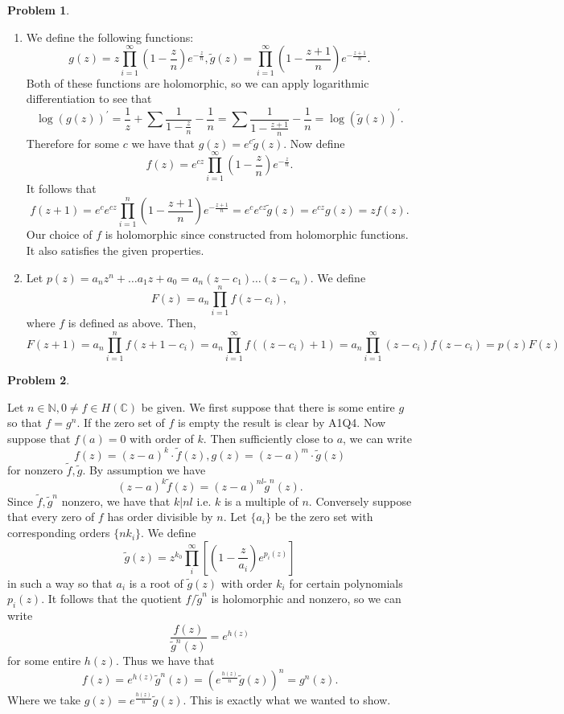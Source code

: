 \documentclass[12pt, a4paper]{article}
\newtheorem{problem}{Problem}
\theoremstyle{definition}
\newcommand{\penum}{ \begin{enumerate}[label=\bf(\alph*), leftmargin=0pt]}
\newcommand{\epenum}{ \end{enumerate} }
\newcommand{\N}{\mathbb{N}}                           %
\newcommand{\C}{\mathbb{C}}                           %
\begin{document}
\newpage
\begin{problem}
\end{problem}
\penum
\item
We define the following functions: $$g(z) = z\prod_{i=1}^\infty \left(1 - \frac{z}{n}\right)e^{-\frac{z}{n}}, \tilde{g}(z)  = \prod_{i=1}^\infty \left(1 - \frac{z+1}{n} \right)e^{-\frac{z+1}{n}}.$$ Both of these functions are holomorphic, so we can apply logarithmic differentiation to see that $$\log(g(z))^\prime = \frac{1}{z} + \sum \frac{1}{1 - \frac{z}{n}}- \frac{1}{n} = \sum \frac{1}{1 - \frac{z+1}{n}}  - \frac{1}{n} = \log(\tilde{g}(z))^\prime.$$ Therefore for some $c$ we have that $g(z) = e^c \tilde{g}(z).$ Now define $$f(z) = e^{cz} \prod_{i=1}^\infty \left( 1 - \frac{z}{n}\right) e^{-\frac{z}{n}}.$$ It follows that $$f(z+1) = e^c e^{cz} \prod_{i=1}^n \left(1- \frac{z+1}{n}	\right) e^{- \frac{z+1}{n}} = e^{c}e^{cz}\tilde{g}(z) = e^{cz}g(z) =zf(z).$$
Our choice of $f$ is holomorphic since constructed from holomorphic functions. It also satisfies the given properties. 
\item Let $p(z) = a_nz^n + \dots a_1z+a_0 = a_n(z-c_1)\dots (z-c_n).$ We define $$F(z) = a_n \prod_{i=1}^n f(z-c_i),$$ where $f$ is defined as above. Then, $$F(z+1) = a_n \prod_{i=1}^n f(z+1-c_i) = a_n \prod_{i=1}^\infty f((z-c_i) +1) =a_n \prod_{i=1}^\infty(z-c_i)f(z-c_i) = p(z)F(z)$$
\epenum
\newpage
\begin{problem}
\end{problem}
Let $n\in \N, 0\neq f\in H(\C)$ be given. We first suppose that there is some entire $g$ so that $f = g^n$. If the zero set of $f$ is empty the result is clear by A1Q4. Now suppose that $f(a)=0$ with order of $k$. Then sufficiently close to $a$, we can write $$f(z) = (z-a)^k \cdot \tilde{f}(z), g(z) = (z-a)^m\cdot \tilde{g}(z)$$
for nonzero $\tilde{f}, \tilde{g}.$ By assumption we have $$(z-a)^k \tilde{f}(z) = (z-a)^{nl}\tilde{g}^n(z).$$ Since $\tilde{f},\tilde{g}^n$ nonzero, we have that $k|nl$ i.e. $k$ is a multiple of $n$. Conversely suppose that every zero of $f$ has order divisible by $n$. Let $\{a_i\}$ be the zero set with corresponding orders $\{nk_i\}$. We define $$\tilde{g}(z) = z^{k_0} \prod_{i}^\infty \left[ \left(1- \frac{z}{a_i} \right) e^{p_i(z)}\right]$$ in such a way so that $a_i$ is a root of $\tilde{g}(z)$ with order $k_i$ for certain polynomials $p_i(z)$. It follows that the quotient $f/\tilde{g}^n$ is holomorphic and nonzero, so we can write $$\frac{f(z)}{\tilde{g}^n(z)} = e^{h(z)}$$ for some entire $h(z)$. Thus we have that $$f(z) = e^{h(z)}\tilde{g}^n(z) = \left(e^{\frac{h(z)}{n}}\tilde{g}(z) \right)^n = g^n(z).$$ Where we take $g(z) = e^{\frac{h(z)}{n}} \tilde{g}(z). $ This is exactly what we wanted to show. 
\end{document}
